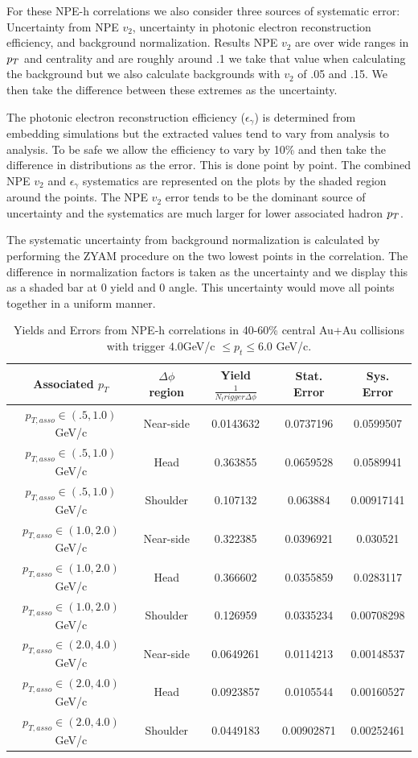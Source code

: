 For these NPE-h correlations we also consider three sources of systematic error: Uncertainty from NPE $v_2$, uncertainty in photonic electron reconstruction efficiency, and background normalization. Results NPE $v_2$ are over wide ranges in $p_{T}$ and centrality and are roughly around .1 we take that value when calculating the background but we also calculate backgrounds with $v_2$ of .05 and .15. We then take the difference between these extremes as the uncertainty. 

The photonic electron reconstruction efficiency ($\epsilon_\gamma$) is determined from embedding simulations but the extracted values tend to vary from analysis to analysis. To be safe we allow the efficiency to vary by 10\% and then take the difference in distributions as the error. This is done point by point. The combined NPE $v_2$ and $\epsilon_\gamma$ systematics are represented on the plots by the shaded region around the points. The NPE $v_2$ error tends to be the dominant source of uncertainty and the systematics are much larger for lower associated hadron $p_{T}$.

The systematic uncertainty from background normalization is calculated by performing the ZYAM procedure on the two lowest points in the correlation. The difference in normalization factors is taken as the uncertainty and we display this as a shaded bar at 0 yield and 0 angle. This uncertainty would move all points together in a uniform manner.

\begin{table}
\centering
\begin{tabular}{|c|c|c|c|c|}
\hline
Associated $p_T$	& $\Delta\phi$ region & Yield $\frac{1}{N_trigger \Delta\phi}$ & Stat. Error & Sys. Error\\
\hline
$p_{T,asso} \in(.5, 1.0)$ GeV/c  & Near-side & 0.0143632 & 0.0737196 & 0.0599507 \\
\hline
$p_{T,asso} \in(.5, 1.0)$ GeV/c  & Head & 0.363855 & 0.0659528 & 0.0589941 \\
\hline
$p_{T,asso} \in(.5, 1.0)$ GeV/c  & Shoulder & 0.107132 & 0.063884 & 0.00917141 \\
\hline
$p_{T,asso} \in(1.0, 2.0)$ GeV/c  & Near-side & 0.322385 & 0.0396921 & 0.030521 \\
\hline
$p_{T,asso} \in(1.0, 2.0)$ GeV/c  & Head & 0.366602 & 0.0355859 & 0.0283117 \\
\hline
$p_{T,asso} \in(1.0, 2.0)$ GeV/c  & Shoulder & 0.126959 & 0.0335234 & 0.00708298 \\
\hline
$p_{T,asso} \in(2.0, 4.0)$ GeV/c  & Near-side & 0.0649261 & 0.0114213 & 0.00148537 \\
\hline
$p_{T,asso} \in(2.0, 4.0)$ GeV/c  & Head & 0.0923857 & 0.0105544 & 0.00160527 \\
\hline
$p_{T,asso} \in(2.0, 4.0)$ GeV/c  & Shoulder & 0.0449183 & 0.00902871 & 0.00252461 \\
\hline
\end{tabular}
\caption[Yields and Errors in Au+Au Correlations, 40-60\%, Low Trigger]{Yields and Errors from NPE-h correlations in 40-60\% central Au+Au collisions with trigger $4.0 $GeV/c $\leq p_t \leq 6.0$ GeV/c.}
\label{tab:AuAuYieldPeriLow}
\end{table} 

